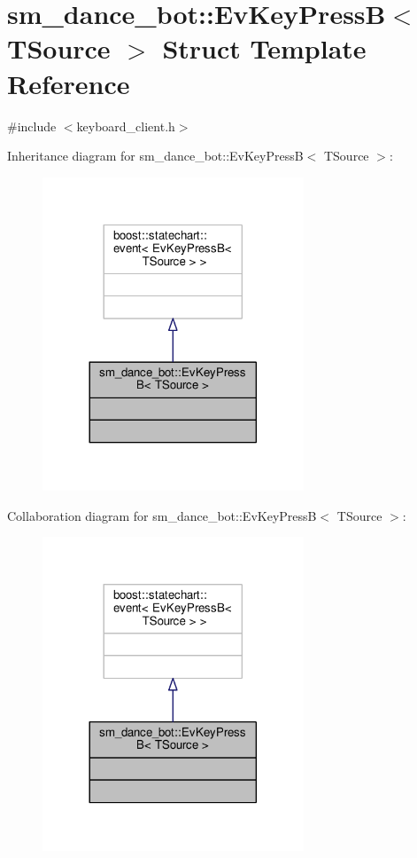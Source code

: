 \hypertarget{structsm__dance__bot_1_1EvKeyPressB}{}\section{sm\+\_\+dance\+\_\+bot\+:\+:Ev\+Key\+PressB$<$ T\+Source $>$ Struct Template Reference}
\label{structsm__dance__bot_1_1EvKeyPressB}


{\ttfamily \#include $<$keyboard\+\_\+client.\+h$>$}



Inheritance diagram for sm\+\_\+dance\+\_\+bot\+:\+:Ev\+Key\+PressB$<$ T\+Source $>$\+:
\nopagebreak
\begin{figure}[H]
\begin{center}
\leavevmode
\includegraphics[width=221pt]{structsm__dance__bot_1_1EvKeyPressB__inherit__graph}
\end{center}
\end{figure}


Collaboration diagram for sm\+\_\+dance\+\_\+bot\+:\+:Ev\+Key\+PressB$<$ T\+Source $>$\+:
\nopagebreak
\begin{figure}[H]
\begin{center}
\leavevmode
\includegraphics[width=221pt]{structsm__dance__bot_1_1EvKeyPressB__coll__graph}
\end{center}
\end{figure}


